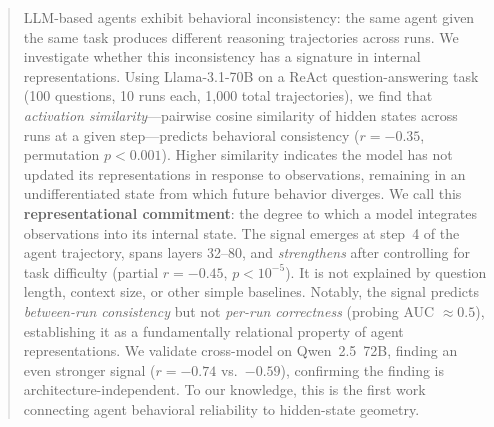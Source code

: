 \documentclass{article}
\begin{document}

\printAffiliationsAndNotice{}

\begin{abstract}
LLM-based agents exhibit behavioral inconsistency: the same agent given the same task produces different reasoning trajectories across runs. We investigate whether this inconsistency has a signature in internal representations. Using Llama-3.1-70B on a ReAct question-answering task (100 questions, 10 runs each, 1{,}000 total trajectories), we find that \emph{activation similarity}---pairwise cosine similarity of hidden states across runs at a given step---predicts behavioral consistency ($r = -0.35$, permutation $p < 0.001$). Higher similarity indicates the model has not updated its representations in response to observations, remaining in an undifferentiated state from which future behavior diverges. We call this \textbf{representational commitment}: the degree to which a model integrates observations into its internal state. The signal emerges at step~4 of the agent trajectory, spans layers 32--80, and \emph{strengthens} after controlling for task difficulty (partial $r = -0.45$, $p < 10^{-5}$). It is not explained by question length, context size, or other simple baselines. Notably, the signal predicts \emph{between-run consistency} but not \emph{per-run correctness} (probing AUC $\approx 0.5$), establishing it as a fundamentally relational property of agent representations. We validate cross-model on Qwen~2.5~72B, finding an even stronger signal ($r = -0.74$ vs.\ $-0.59$), confirming the finding is architecture-independent. To our knowledge, this is the first work connecting agent behavioral reliability to hidden-state geometry.
\end{abstract}
\end{document}
